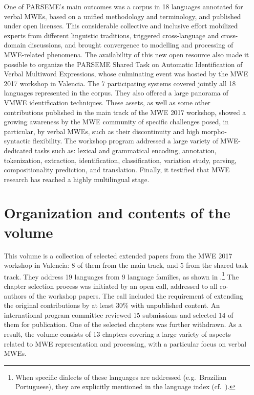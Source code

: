 \documentclass[output=paper,
modfonts,
]{langscibook}
\begin{document}
One of PARSEME's main outcomes was a corpus in 18 languages annotated for verbal MWEs, based on a unified methodology and terminology, %
and published under open licenses. This considerable collective and inclusive effort mobilized experts from different linguistic traditions, triggered cross-language and cross-domain discussions, and brought convergence to modelling and processing of MWE-related phenomena. The availability of this %
new open resource also made it possible to organize the PARSEME Shared Task on Automatic Identification of Verbal Multiword Expressions, whose culminating event was hosted by the MWE 2017 workshop in Valencia. The 7 participating systems covered jointly all 18 languages represented in the corpus. They also offered a large panorama of VMWE identification techniques. These assets, as well as some other contributions published in the main track of the MWE 2017 workshop, showed a growing awareness by the MWE community of specific challenges posed, in particular, 
by verbal MWEs, such as their discontinuity and high morpho-syntactic flexibility. The workshop program addressed a large variety of MWE-dedicated tasks such as: lexical and grammatical encoding, annotation, tokenization, extraction, identification, classification, variation study, parsing, compositionality prediction, and translation. Finally, it testified that MWE research has reached a highly multilingual stage. 

\section{Organization and contents of the volume}

This volume is a collection of selected extended papers from the MWE 2017 workshop in Valencia: 8 of them from the main track, and 5 from the shared task track. They address 19 languages from 9 language families, as shown in .\footnote{When specific dialects of these languages are addressed (e.g.~Brazilian Portuguese), they are explicitly mentioned in the language index (cf.~\pageref{??}).}
The chapter selection process was initiated by an open call, addressed to all co-authors of the workshop papers. The call included %
the requirement of extending the original contributions by at least 30\% with unpublished content. An %
international program committee reviewed 15 submissions and selected 14 of them for publication. One of the selected chapters was further withdrawn. As a result, the volume consists of 13 chapters covering a large variety of aspects related to  MWE representation and processing, with a particular focus on verbal MWEs.
\end{document}

